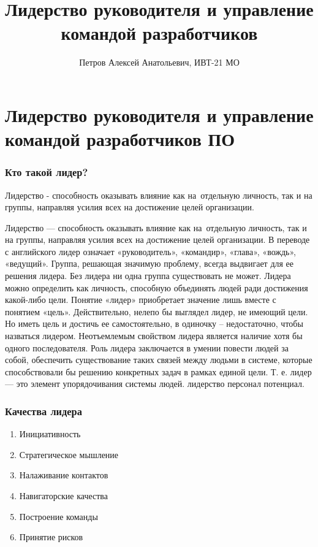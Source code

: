 \documentclass{../industrial-development}
\title{Лидерство руководителя и управление командой разработчиков}
\author{Петров Алексей Анатольевич, ИВТ-21 МО}
\date{}
\begin{document}
\begin{frame}
  \titlepage
\end{frame}

\section{Лидерство руководителя и управление командой разработчиков ПО}

\begin{frame} \frametitle{Кто такой лидер?}
 Лидерство - способность оказывать влияние как на~отдельную личность, так и на группы, направляя усилия всех на достижение целей организации.
\end{frame}

\lecturenotes

Лидерство --- способность оказывать влияние как на~отдельную личность, так и на группы, направляя усилия всех на достижение целей организации. В переводе с английского лидер означает «руководитель», «командир», «глава», «вождь», «ведущий». Группа, решающая значимую проблему, всегда выдвигает для ее решения лидера. Без лидера ни одна группа существовать не может. Лидера можно определить как личность, способную объединять людей ради достижения какой-либо цели. Понятие «лидер» приобретает значение лишь вместе с понятием «цель». Действительно, нелепо бы выглядел лидер, не имеющий цели.
Но иметь цель и достичь ее самостоятельно, в одиночку -- недостаточно, чтобы назваться лидером. Неотъемлемым свойством лидера является наличие хотя бы одного последователя. Роль лидера заключается в умении повести людей за собой, обеспечить существование таких связей между людьми в системе, которые способствовали бы решению конкретных задач в рамках единой цели. Т. е. лидер --- это элемент упорядочивания системы людей. лидерство персонал потенциал.


\begin{frame} \frametitle{Качества лидера}
  \begin{enumerate}
  \item Инициативность
  \item Стратегическое мышление
  \item Налаживание контактов
  \item Навигаторские качества
  \item Построение команды
  \item Принятие рисков  
  \end{enumerate}
\end{frame}

\lecturenotes
\end{document}
